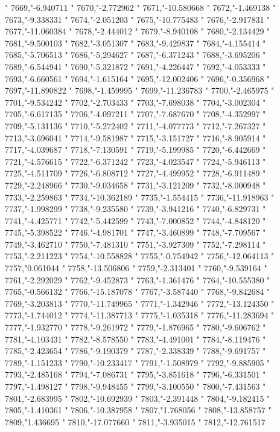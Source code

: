 "
7669,"-6.940711
"
7670,"-2.772962
"
7671,"-10.580668
"
7672,"-1.469138
"
7673,"-9.338331
"
7674,"-2.051203
"
7675,"-10.775483
"
7676,"-2.917831
"
7677,"-11.060384
"
7678,"-2.444012
"
7679,"-8.940108
"
7680,"-2.134429
"
7681,"-9.500103
"
7682,"-3.051307
"
7683,"-9.429837
"
7684,"-4.155414
"
7685,"-5.706513
"
7686,"-5.294627
"
7687,"-6.371243
"
7688,"-3.695206
"
7689,"-6.544941
"
7690,"-5.321872
"
7691,"-4.226447
"
7692,"-4.053333
"
7693,"-6.660561
"
7694,"-1.615164
"
7695,"-12.002406
"
7696,"-0.356968
"
7697,"-11.890822
"
7698,"-1.459995
"
7699,"-11.236783
"
7700,"-2.465975
"
7701,"-9.534242
"
7702,"-2.703433
"
7703,"-7.698038
"
7704,"-3.002304
"
7705,"-6.617135
"
7706,"-4.097211
"
7707,"-7.687670
"
7708,"-4.352997
"
7709,"-5.131136
"
7710,"-5.272402
"
7711,"-4.077773
"
7712,"-7.267327
"
7713,"-3.696041
"
7714,"-9.581987
"
7715,"-3.151727
"
7716,"-8.905914
"
7717,"-4.039687
"
7718,"-7.130591
"
7719,"-5.199985
"
7720,"-6.442669
"
7721,"-4.576615
"
7722,"-6.371242
"
7723,"-4.023547
"
7724,"-5.946113
"
7725,"-4.511709
"
7726,"-6.808712
"
7727,"-4.499952
"
7728,"-6.911489
"
7729,"-2.248966
"
7730,"-9.034658
"
7731,"-3.121209
"
7732,"-8.000948
"
7733,"-2.259863
"
7734,"-10.362189
"
7735,"-1.554415
"
7736,"-11.918963
"
7737,"-1.998299
"
7738,"-9.235580
"
7739,"-3.941216
"
7740,"-6.829731
"
7741,"-4.425771
"
7742,"-5.442599
"
7743,"-7.000852
"
7744,"-4.848120
"
7745,"-5.398522
"
7746,"-4.981701
"
7747,"-3.460899
"
7748,"-7.709567
"
7749,"-3.462710
"
7750,"-7.481310
"
7751,"-3.927309
"
7752,"-7.298114
"
7753,"-2.211223
"
7754,"-10.558828
"
7755,"-0.754942
"
7756,"-12.064113
"
7757,"0.061044
"
7758,"-13.506806
"
7759,"-2.313401
"
7760,"-9.539164
"
7761,"-2.292029
"
7762,"-9.452873
"
7763,"-1.361476
"
7764,"-10.555380
"
7765,"-0.566132
"
7766,"-15.187078
"
7767,"-3.587440
"
7768,"-9.842684
"
7769,"-3.203813
"
7770,"-11.749965
"
7771,"-1.342946
"
7772,"-13.124350
"
7773,"-1.744012
"
7774,"-11.387713
"
7775,"-1.035318
"
7776,"-11.283694
"
7777,"-1.932770
"
7778,"-9.261972
"
7779,"-1.876965
"
7780,"-9.606762
"
7781,"-4.103431
"
7782,"-8.578550
"
7783,"-4.491001
"
7784,"-8.119476
"
7785,"-2.423654
"
7786,"-9.190379
"
7787,"-2.338339
"
7788,"-9.691757
"
7789,"-1.151233
"
7790,"-10.233417
"
7791,"-1.508979
"
7792,"-9.885905
"
7793,"-2.485168
"
7794,"-7.086731
"
7795,"-3.851618
"
7796,"-6.331501
"
7797,"-1.498127
"
7798,"-9.948455
"
7799,"-3.100550
"
7800,"-7.431563
"
7801,"-2.683995
"
7802,"-10.692939
"
7803,"-2.391448
"
7804,"-9.182415
"
7805,"-1.410361
"
7806,"-10.387958
"
7807,"1.768056
"
7808,"-13.858757
"
7809,"1.436695
"
7810,"-17.077660
"
7811,"-3.935015
"
7812,"-12.761517
